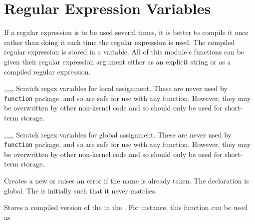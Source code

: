 \documentclass[oneside]{book}
\begin{document}
\section{Regular Expression Variables}

If a regular expression is to be used several times,
it is better to compile it once rather than doing it
each time the regular expression is used. The compiled
regular expression is stored in a variable. All
of this module's functions can be given their
regular expression argument either as an explicit string
or as a compiled regular expression.

\begin{variable}{\lTmpaRegex,\lTmpbRegex,\lTmpcRegex,\lTmpiRegex,\lTmpjRegex,\lTmpkRegex}
Scratch regex variables for local assignment. These are never used by
\verb!function! package, and so are safe for use with any function.
However, they may be overwritten by other non-kernel
code and so should only be used for short-term storage.
\end{variable}

\begin{variable}{\gTmpaRegex,\gTmpbRegex,\gTmpcRegex,\gTmpiRegex,\gTmpjRegex,\gTmpkRegex}
Scratch regex variables for global assignment. These are never used by
\verb!function! package, and so are safe for use with any function.
However, they may be overwritten by other non-kernel
code and so should only be used for short-term storage.
\end{variable}

\begin{function}{\RegexNew}
\begin{syntax}
 
\end{syntax}
Creates a new  or raises an error if the
name is already taken. The declaration is global. The
 is initially such that it never matches.
\end{function}

\begin{function}{\RegexSet}
\begin{syntax}
  
\end{syntax}
Stores a compiled version of the  in the
. For instance, this function can be
used as
\begin{codehigh}
\RegexNew \lMyRegex
\RegexSet {}
\end{codehigh}
\end{function}
\end{document}

